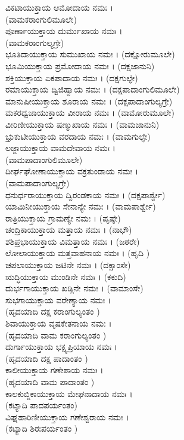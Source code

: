  ವಿಕಟಾಯುಕ್ತಾಯ ಆಮೋದಾಯ ನಮಃ । \\(ವಾಮಕರಾಂಗುಲಿಮೂಲೇ)\\
 ಪೂರ್ಣಾಯುಕ್ತಾಯ ದುರ್ಮುಖಾಯ ನಮಃ । \\(ವಾಮಕರಾಂಗುಲ್ಯಗ್ರೇ)\\
 ಭೂತಿದಾಯುಕ್ತಾಯ ಸುಮುಖಾಯ ನಮಃ । (ದಕ್ಷೋರುಮೂಲೇ)\\
 ಭೂಮಿಯುಕ್ತಾಯ ಪ್ರಮೋದಾಯ ನಮಃ । (ದಕ್ಷಜಾನುನಿ)\\
 ಶಕ್ತಿಯುಕ್ತಾಯ ಏಕಪಾದಾಯ ನಮಃ । (ದಕ್ಷಗುಲ್ಫೇ)\\
 ರಮಾಯುಕ್ತಾಯ ದ್ವಿಜಿಹ್ವಾಯ ನಮಃ । (ದಕ್ಷಪಾದಾಂಗುಲಿಮೂಲೇ)\\
 ಮಾನುಷೀಯುಕ್ತಾಯ ಶೂರಾಯ ನಮಃ । (ದಕ್ಷಪಾದಾಂಗುಲ್ಯಗ್ರೇ)\\
 ಮಕರಧ್ವಜಾಯುಕ್ತಾಯ ವೀರಾಯ ನಮಃ । (ವಾಮೋರುಮೂಲೇ)\\
 ವೀರಿಣೀಯುಕ್ತಾಯ ಷಣ್ಮುಖಾಯ ನಮಃ । (ವಾಮಜಾನುನಿ)\\
 ಭ್ರುಕುಟೀಯುಕ್ತಾಯ ವರದಾಯ ನಮಃ । (ವಾಮಗುಲ್ಫೇ)\\
 ಲಜ್ಜಾಯುಕ್ತಾಯ ವಾಮದೇವಾಯ ನಮಃ ।\\(ವಾಮಪಾದಾಂಗುಲಿಮೂಲೇ)\\
 ದೀರ್ಘಘೋಣಾಯುಕ್ತಾಯ ವಕ್ರತುಂಡಾಯ ನಮಃ ।\\ (ವಾಮಪಾದಾಂಗುಲ್ಯಗ್ರೇ)\\
 ಧನುರ್ಧರಾಯುಕ್ತಾಯ ದ್ವಿರಂಡಕಾಯ ನಮಃ । (ದಕ್ಷಪಾರ್ಶ್ವೇ)\\
 ಯಾಮಿನೀಯುಕ್ತಾಯ ಸೇನಾನ್ಯೇ ನಮಃ । (ವಾಮಪಾರ್ಶ್ವೇ)\\
 ರಾತ್ರಿಯುಕ್ತಾಯ ಗ್ರಾಮಣ್ಯೇ ನಮಃ । (ಪೃಷ್ಠೇ)\\
 ಚಂದ್ರಿಕಾಯುಕ್ತಾಯ ಮತ್ತಾಯ ನಮಃ । (ನಾಭೌ)\\
 ಶಶಿಪ್ರಭಾಯುಕ್ತಾಯ ವಿಮತ್ತಾಯ ನಮಃ । (ಜಠರೇ)\\
 ಲೋಲಾಯುಕ್ತಾಯ ಮತ್ತವಾಹನಾಯ ನಮಃ । (ಹೃದಿ )\\
 ಚಪಲಾಯುಕ್ತಾಯ ಜಟಿನೇ ನಮಃ । (ದಕ್ಷಾಂಸೇ)\\
 ಋದ್ಧಿಯುಕ್ತಾಯ ಮುಂಡಿನೇ ನಮಃ । (ಕಕುದಿ)\\
 ದುರ್ಭಗಾಯುಕ್ತಾಯ ಖಡ್ಗಿನೇ ನಮಃ । (ವಾಮಾಂಸೇ)\\
 ಸುಭಗಾಯುಕ್ತಾಯ ವರೇಣ್ಯಾಯ ನಮಃ ।\\ (ಹೃದಯಾದಿ ದಕ್ಷ ಕರಾಂಗುಲ್ಯಂತಂ )\\
 ಶಿವಾಯುಕ್ತಾಯ ವೃಷಕೇತನಾಯ ನಮಃ । \\(ಹೃದಯಾದಿ ವಾಮ ಕರಾಂಗುಲ್ಯಂತಂ )\\
 ದುರ್ಗಾಯುಕ್ತಾಯ ಭಕ್ಷ್ಯಪ್ರಿಯಾಯ ನಮಃ । \\(ಹೃದಯಾದಿ ದಕ್ಷ ಪಾದಾಂತಂ )\\
 ಕಾಲೀಯುಕ್ತಾಯ ಗಣೇಶಾಯ ನಮಃ । \\(ಹೃದಯಾದಿ ವಾಮ ಪಾದಾಂತಂ )\\
 ಕಾಲಕುಬ್ಜಿಕಾಯುಕ್ತಾಯ ಮೇಘನಾದಾಯ ನಮಃ ।\\ (ಕಟ್ಯಾದಿ ಪಾದಪರ್ಯಂತಂ)\\
 ವಿಘ್ನಹಾರಿಣೀಯುಕ್ತಾಯ ಗಣೇಶ್ವರಾಯ ನಮಃ । \\(ಕಟ್ಯಾದಿ ಶಿರಃಪರ್ಯಂತಂ )
